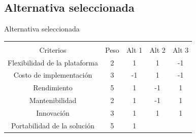 \documentclass[10pt,aspectratio=169]{beamer} %
\begin{document}
\subsection{Alternativa seleccionada}

\begin{frame}{Alternativa seleccionada}
  \begin{table}[h!]
    {
    \label{tab:matriz_de_pugh}
    \begin{tabular}{ccccc}
    \hline
    \multicolumn{1}{|c|}{\cellcolor[HTML]{93C47D}} &
      \multicolumn{1}{c|}{\cellcolor[HTML]{93C47D}} &
      \multicolumn{1}{c|}{\cellcolor[HTML]{93C47D}} &
      \multicolumn{1}{c|}{\cellcolor[HTML]{93C47D}} &
      \multicolumn{1}{c|}{\cellcolor[HTML]{93C47D}} \\
    \multicolumn{1}{|c|}{\multirow{-2}{*}{\cellcolor[HTML]{93C47D} Criterios}} &
      \multicolumn{1}{c|}{\multirow{-2}{*}{\cellcolor[HTML]{93C47D} Peso}} &
      \multicolumn{1}{c|}{\multirow{-2}{*}{\cellcolor[HTML]{93C47D} Alt 1}} &
      \multicolumn{1}{c|}{\multirow{-2}{*}{\cellcolor[HTML]{93C47D} Alt 2}} &
      \multicolumn{1}{c|}{\multirow{-2}{*}{\cellcolor[HTML]{93C47D} Alt 3}} \\ \hline
    \multicolumn{1}{|c|}{\cellcolor[HTML]{93C47D} Flexibilidad de la plataforma} &
      \multicolumn{1}{c|}{2} &
      \multicolumn{1}{c|}{1} &
      \multicolumn{1}{c|}{1} &
      \multicolumn{1}{c|}{-1} \\ \hline
    \multicolumn{1}{|c|}{\cellcolor[HTML]{93C47D} Costo de implementación} &
      \multicolumn{1}{c|}{3} &
      \multicolumn{1}{c|}{-1} &
      \multicolumn{1}{c|}{1} &
      \multicolumn{1}{c|}{-1} \\ \hline
    \multicolumn{1}{|c|}{\cellcolor[HTML]{93C47D} Rendimiento} &
      \multicolumn{1}{c|}{5} &
      \multicolumn{1}{c|}{1} &
      \multicolumn{1}{c|}{-1} &
      \multicolumn{1}{c|}{1} \\ \hline
    \multicolumn{1}{|c|}{\cellcolor[HTML]{93C47D} Mantenibilidad} &
      \multicolumn{1}{c|}{2} &
      \multicolumn{1}{c|}{1} &
      \multicolumn{1}{c|}{-1} &
      \multicolumn{1}{c|}{1} \\ \hline
    \multicolumn{1}{|c|}{\cellcolor[HTML]{93C47D} Innovación} &
      \multicolumn{1}{c|}{3} &
      \multicolumn{1}{c|}{1} &
      \multicolumn{1}{c|}{1} &
      \multicolumn{1}{c|}{1} \\ \hline
    \multicolumn{1}{|c|}{\cellcolor[HTML]{93C47D} Portabilidad de la solución} &
      \multicolumn{1}{c|}{5} &
      \multicolumn{1}{c|}{1} &

\end{tabular}}
\end{table}
\end{frame}
\end{document}
